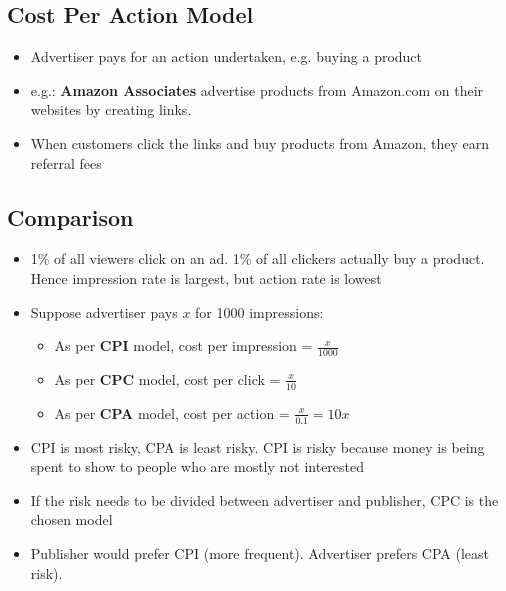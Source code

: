 \documentclass{article}
\begin{document}
\subsection{Cost Per Action Model}
\begin{itemize}
    \item Advertiser pays for an action undertaken, e.g. buying a product
    
    \item e.g.: \textbf{Amazon Associates} advertise products from Amazon.com on their websites by creating links. 
    
    \item When customers click the links and buy products from Amazon, they earn referral fees
\end{itemize}

\subsection{Comparison}
\begin{itemize}
    \item 1\% of all viewers click on an ad. 1\% of all clickers actually buy a product. Hence impression rate is largest, but action rate is lowest
    
    \item Suppose advertiser pays $x$ for 1000 impressions:
    \begin{itemize}
        \item As per \textbf{CPI} model, cost per impression = $\frac{x}{1000}$
        
        \item As per \textbf{CPC} model, cost per click = $\frac{x}{10}$
        
        \item As per \textbf{CPA} model, cost per action = $\frac{x}{0.1} = 10x$
    \end{itemize}
    
    \item CPI is most risky, CPA is least risky. CPI is risky because money is being spent to show to people who are mostly not interested
    
    \item If the risk needs to be divided between advertiser and publisher, CPC is the chosen model
    
    \item Publisher would prefer CPI (more frequent). Advertiser prefers CPA (least risk). 
\end{itemize}
\end{document}
